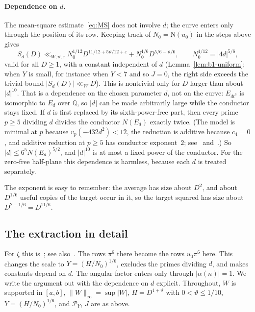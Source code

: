 \documentclass[11pt]{article}
\numberwithin{equation}{section}
\newcommand{\N}{\mathrm N}
\begin{document}
\paragraph{Dependence on $d$.} The mean-square estimate~\eqref{eq:MS} does not involve $d$; the curve
enters only through the position of its row. Keeping track of $N_0=\N(u_0)$ in the steps above gives
\begin{equation}\label{eq:d023}
 S_d(D)\ll_{W,\vartheta,\varepsilon}N_0^{1/12}D^{11/12+5\vartheta/12+\varepsilon}+N_0^{1/6}D^{5/6-\vartheta/6},
 \qquad N_0^{1/12}=|4d|^{5/6},
\end{equation}
valid for all $D\ge1$, with a constant independent of $d$ (Lemma~\ref{lem:b1-uniform}; when $Y$ is small,
for instance when $Y<7$ and so $J=0$, the right side exceeds the trivial bound $|S_d(D)|\ll_WD$). This is
nontrivial only for $D$ larger than about
$|d|^{10}$. That is a dependence on the chosen parameter $d$, not on the curve: $E_{dt^6}$ is isomorphic
to $E_d$ over $\mathbb Q$, so $|d|$ can be made arbitrarily large while the conductor stays fixed. If $d$ is
first replaced by its sixth-power-free part, then every prime $p\ge5$ dividing $d$ divides the
conductor $N(E_d)$ exactly twice. (The model is minimal at $p$ because $v_p(-432d^2)<12$, the reduction is
additive because $c_4=0$, and additive reduction at $p\ge5$ has conductor exponent~$2$;
see~\cite[Remark~VII.1.1 and Proposition~VII.5.1]{SilAEC} and~\cite[Chapter~IV, \S10]{SilATAEC}.)
So $|d|\le6^5N(E_d)^{5/2}$, and $|d|^{10}$ is at most a fixed power of the
conductor. For the zero-free half-plane this dependence is harmless, because each $d$ is treated
separately.

The exponent is easy to remember: the average has size about $D^2$,
and about $D^{1/6}$ useful copies of the target occur in it, so the
target squared has size about $D^{2-1/6}=D^{11/6}$.

\subsection{The extraction in detail}\label{sec:b1-extraction}
For $\zeta$ this is~\cite[Section~3, proof of Theorem~1.1, (3.2)--(3.3)]{OAI1112}; see also~\cite[(4.3)--(4.6) and
Section~5]{ZG}. The rows $\pi^6$ there become the rows $u_0\pi^6$ here. This changes the scale to
$Y=(H/N_0)^{1/6}$, excludes the primes dividing $d$, and makes constants depend on $d$. The angular factor enters only
through $|\alpha(n)|=1$. We write the argument out with the dependence on $d$ explicit. Throughout, $W$ is supported in
$[a,b]$, $\|W\|_\infty=\sup|W|$, $H=D^{1+\vartheta}$ with $0<\vartheta\le1/10$, $Y=(H/N_0)^{1/6}$, and
$\mathcal P_Y$, $J$ are as above.
\end{document}
